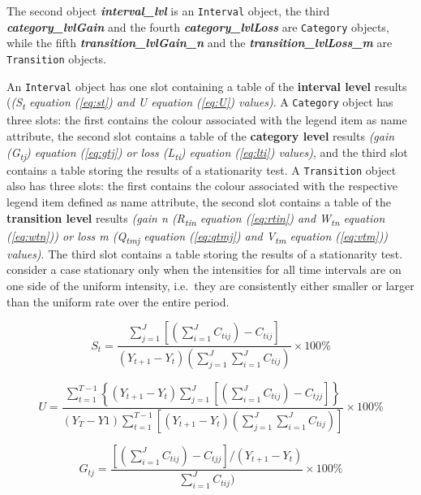 The second object \emph{\textbf{interval\_lvl}} is an \texttt{Interval}
object, the third \emph{\textbf{category\_lvlGain}} and the fourth
\emph{\textbf{category\_lvlLoss}} are \texttt{Category} objects, while
the fifth \emph{\textbf{transition\_lvlGain\_n}} and the
\emph{\textbf{transition\_lvlLoss\_m}} are \texttt{Transition} objects.

An \texttt{Interval} object has one slot containing a table of the
\textbf{interval level} results (\emph{(S\textsubscript{t} equation
(\ref{eq:st}) and U equation (\ref{eq:U}) values)}. A \texttt{Category}
object has three slots: the first contains the colour associated with
the legend item as name attribute, the second slot contains a table of
the \textbf{category level} results \emph{(gain (G\textsubscript{tj})
equation (\ref{eq:gtj}) or loss (L\textsubscript{ti}) equation
(\ref{eq:lti}) values)}, and the third slot contains a table storing the
results of a stationarity test. A \texttt{Transition} object also has
three slots: the first contains the colour associated with the
respective legend item defined as name attribute, the second slot
contains a table of the \textbf{transition level} results \emph{(gain n
(R\textsubscript{tin} equation (\ref{eq:rtin}) and W\textsubscript{tn}
equation (\ref{eq:wtn})) or loss m (Q\textsubscript{tmj} equation
(\ref{eq:qtmj}) and V\textsubscript{tm} equation (\ref{eq:vtm}))
values)}. The third slot contains a table storing the results of a
stationarity test. \citet{Aldwaik2012} consider a case stationary only
when the intensities for all time intervals are on one side of the
uniform intensity, i.e.~they are consistently either smaller or larger
than the uniform rate over the entire period.

\begin{equation} \label{eq:st}
S_t = \frac{\sum_{j=1}^{J} \left[( \sum_{i=1}^{J} C_{tij}) - C_{tij} \right]}{(Y_{t+1} - Y_{t})\left(\sum_{j=1}^{J} \sum_{i=1}^{J} C_{tij}\right)} \times 100\%
\end{equation}

\begin{equation} \label{eq:U}
U = \frac{\sum_{t=1}^{T-1} \left\{(Y_{t+1} - Y_t) \sum_{j=1}^{J} \left[\left(\sum_{i=1}^{J} C_{tij}\right) - C_{tjj}   \right]\right\}}{(Y_{T} - Y1) \sum_{t=1}^{T-1} \left[(Y_{t+1} - Y_t) \left(\sum_{j=1}^{J} \sum_{i=1}^{J} C_{tij}\right)  \right]} \times 100\%
\end{equation}

\begin{equation} \label{eq:gtj}
G_{tj} = \frac{\left[\left( \sum_{i=1}^{J} C_{tij} \right) - C_{tjj}   \right] / (Y_{t+1} - Y_t)}{\sum_{i=1}^{J} C_{tij})} \times 100\%
\end{equation}

